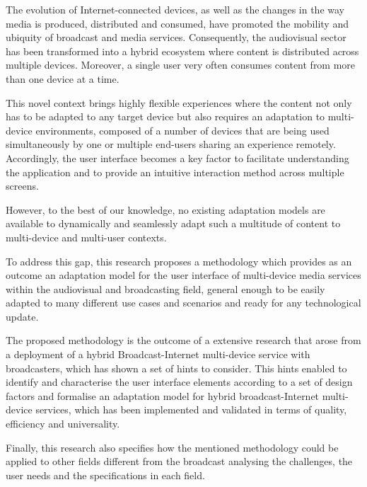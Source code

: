 




\begin{abstracts}        %
The evolution of Internet-connected devices, as well as the changes in the way media is produced, distributed and consumed, have promoted the mobility and ubiquity of broadcast and media services. Consequently, the audiovisual sector has been transformed into a hybrid ecosystem where content is distributed across multiple devices. Moreover, a single user very often consumes content from more than one device at a time. 

This novel context brings highly flexible experiences where the content not only has to be adapted to any target device but also requires an adaptation to multi-device environments, composed of a number of devices that are being used simultaneously by one or multiple end-users sharing an experience remotely.
Accordingly, the user interface becomes a key factor to facilitate understanding the application and to provide an intuitive interaction method across multiple screens.

However, to the best of our knowledge, no existing adaptation models are available to dynamically and seamlessly adapt such a multitude of content to multi-device and multi-user contexts.

To address this gap, this research proposes a methodology which provides as an outcome an adaptation model for the user interface of multi-device media services within the audiovisual and broadcasting field, general enough to be easily adapted to many different use cases and scenarios and ready for any technological update. 

The proposed methodology is the outcome of a extensive research that arose from a deployment of a hybrid Broadcast-Internet multi-device service with broadcasters, which has shown a set of hints to consider. This hints enabled to identify and characterise the user interface elements according to a set of design factors and formalise an adaptation model for hybrid broadcast-Internet multi-device services, which has been implemented and validated in terms of quality, efficiency and universality.

Finally, this research also specifies how the mentioned methodology could be applied to other fields different from the broadcast analysing the challenges, the user needs and the specifications in each field.




\end{abstracts}

